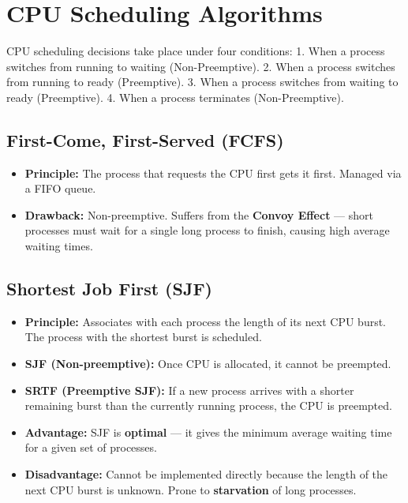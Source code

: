 \documentclass[12pt,a4paper]{article}
\begin{document}
\section{CPU Scheduling Algorithms}

CPU scheduling decisions take place under four conditions:
1. When a process switches from running to waiting (Non-Preemptive).
2. When a process switches from running to ready (Preemptive).
3. When a process switches from waiting to ready (Preemptive).
4. When a process terminates (Non-Preemptive).

\subsection{First-Come, First-Served (FCFS)}
\begin{itemize}[leftmargin=*, itemsep=3pt]
  \item \textbf{Principle:} The process that requests the CPU first gets it first. Managed via a FIFO queue.
  \item \textbf{Drawback:} Non-preemptive. Suffers from the \textbf{Convoy Effect} --- short processes must wait for a single long process to finish, causing high average waiting times.
\end{itemize}

\subsection{Shortest Job First (SJF)}
\begin{itemize}[leftmargin=*, itemsep=3pt]
  \item \textbf{Principle:} Associates with each process the length of its next CPU burst. The process with the shortest burst is scheduled.
  \item \textbf{SJF (Non-preemptive):} Once CPU is allocated, it cannot be preempted.
  \item \textbf{SRTF (Preemptive SJF):} If a new process arrives with a shorter remaining burst than the currently running process, the CPU is preempted.
  \item \textbf{Advantage:} SJF is \textbf{optimal} --- it gives the minimum average waiting time for a given set of processes.
  \item \textbf{Disadvantage:} Cannot be implemented directly because the length of the next CPU burst is unknown. Prone to \textbf{starvation} of long processes.
\end{itemize}
\end{document}
